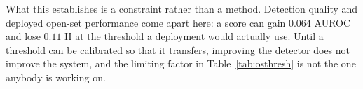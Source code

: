 What this establishes is a constraint rather than a method. Detection quality and
deployed open-set performance come apart here: a score can gain $0.064$ AUROC and lose
$0.11$ H at the threshold a deployment would actually use. Until a threshold can be
calibrated so that it transfers, improving the detector does not improve the system, and
the limiting factor in Table~\ref{tab:osthresh} is not the one anybody is working on.
